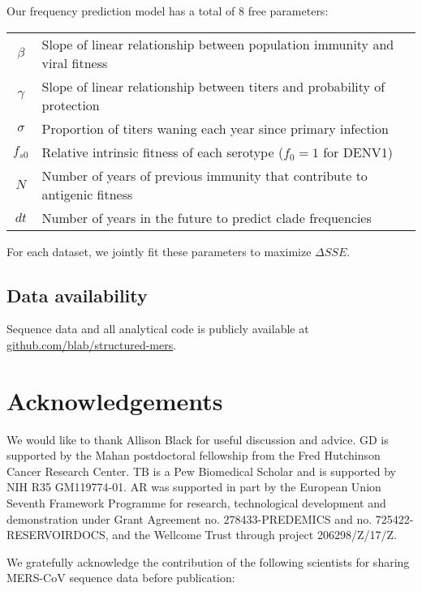 \documentclass[11pt,oneside,letterpaper]{article}
\begin{document}
Our frequency prediction model has a total of 8 free parameters:
\begin{table}[h!]
  \begin{center}
    \label{tab:table1}
    \begin{tabular}{c|l}
      $\beta$ & Slope of linear relationship between population immunity and viral fitness\\
      $\gamma$ & Slope of linear relationship between titers and probability of protection\\
      $\sigma$ & Proportion of titers waning each year since primary infection\\
      $f_{s0}$ & Relative intrinsic fitness of each serotype ($f_0 = 1$ for DENV1)\\
      $N$ & Number of years of previous immunity that contribute to antigenic fitness\\
      $dt$ & Number of years in the future to predict clade frequencies\\
    \end{tabular}
  \end{center}
\end{table}

For each dataset, we jointly fit these parameters to maximize $\Delta SSE$.

\subsection*{Data availability}
Sequence data and all analytical code is publicly available at \href{https://github.com/blab/structured-mers}{github.com/blab/structured-mers}.

\section*{Acknowledgements}
We would like to thank Allison Black for useful discussion and advice.
GD is supported by the Mahan postdoctoral fellowship from the Fred Hutchinson Cancer Research Center.
TB is a Pew Biomedical Scholar and is supported by NIH R35 GM119774-01.
AR was supported in part by the European Union Seventh Framework Programme for research, technological development and demonstration under Grant Agreement no. 278433-PREDEMICS and no. 725422-RESERVOIRDOCS, and the Wellcome Trust through project 206298/Z/17/Z.

We gratefully acknowledge the contribution of the following scientists for sharing MERS-CoV sequence data before publication:
\end{document}
